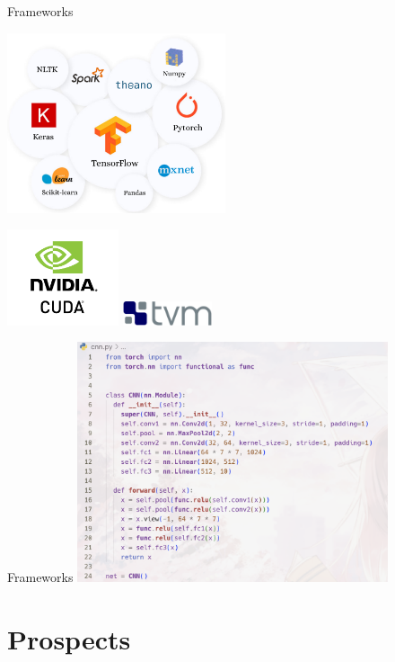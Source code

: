 \documentclass[UTF8]{beamer}
\begin{document}
\begin{frame}{Frameworks}
  \begin{minipage}[b]{0.6\textwidth}
    \includegraphics[height=150pt]{figure/dl_framework.png}
  \end{minipage}
  \begin{minipage}[b]{0.3\textwidth}
    \includegraphics[height=80pt]{figure/nvidia_cuda.png}
    \includegraphics[height=20pt]{figure/tvm_logo_small.png}
  \end{minipage}
\end{frame}

\begin{frame}{Frameworks}
  \includegraphics[height=200pt]{figure/cnn_pytorch.png}
\end{frame}

\section{Prospects}
\end{document}
